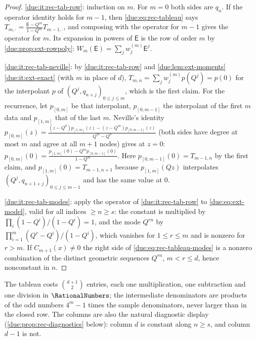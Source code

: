 \documentclass[11pt,oneside]{article}
\theoremstyle{plain}
\theoremstyle{definition}
\theoremstyle{remark}
\newcommand{\upn}[1]{\RvachevUp_{#1}}
\newcommand{\Qq}{Q}                                         %
\newcommand{\Cr}[2]{C_{#1}\!\left(#2\right)}                %
\newcommand{\qn}[1]{q_{#1}}                                 %
\newcommand{\Wrow}[2]{w^{(#1)}_{#2}}                        %
\begin{document}
\begin{proof}
\ref{due:it:rec-tab-row}: induction on $m$.  For $m=0$ both sides are
$\qn{n}$.  If the operator identity holds for $m-1$, then
\cref{due:eq:rec-tableau} says
$T_{m,\cdot}=\frac{\mathsf E-\Qq^{m}}{1-\Qq^{m}}T_{m-1,\cdot}$, and composing
with the operator for $m-1$ gives the operator for $m$.  Its expansion in
powers of $\mathsf E$ is the row of order $m$ by
\cref{due:prop:ext-rowpoly}: $W_{m}(\mathsf E)=\sum_{j}\Wrow{m}{j}\mathsf E^{j}$.

\ref{due:it:rec-tab-neville}: by \ref{due:it:rec-tab-row} and
\cref{due:lem:ext-moments}\ref{due:it:ext-exact} (with $m$ in place of $d$),
$T_{m,n}=\sum_{j}\Wrow{m}{j}p(\Qq^{j})=p(0)$ for the interpolant $p$ of
$(\Qq^{j},\qn{n+j})_{0\le j\le m}$, which is the first claim.  For the
recurrence, let $p_{[0,m]}$ be that interpolant, $p_{[0,m-1]}$ the interpolant
of the first $m$ data and $p_{[1,m]}$ that of the last $m$.  Neville's identity
$p_{[0,m]}(z)=\frac{(z-\Qq^{0})p_{[1,m]}(z)-(z-\Qq^{m})p_{[0,m-1]}(z)}{\Qq^{m}-\Qq^{0}}$
(both sides have degree at most $m$ and agree at all $m+1$ nodes) gives at
$z=0$: $p_{[0,m]}(0)=\frac{p_{[1,m]}(0)-\Qq^{m}p_{[0,m-1]}(0)}{1-\Qq^{m}}$.
Here $p_{[0,m-1]}(0)=T_{m-1,n}$ by the first claim, and
$p_{[1,m]}(0)=T_{m-1,n+1}$ because $p_{[1,m]}(\Qq z)$ interpolates
$(\Qq^{j},\qn{n+1+j})_{0\le j\le m-1}$ and has the same value at $0$.

\ref{due:it:rec-tab-modes}: apply the operator of \ref{due:it:rec-tab-row} to
\cref{due:eq:ext-model}, valid for all indices $\ge n\ge s$: the constant is
multiplied by $\prod_{i}(1-\Qq^{i})/(1-\Qq^{i})=1$, and the mode $\Qq^{rn}$ by
$\prod_{i=1}^{m}(\Qq^{r}-\Qq^{i})/(1-\Qq^{i})$, which vanishes for
$1\le r\le m$ and is nonzero for $r>m$.  If $\Cr{m+1}{x}\ne0$ the right side
of \cref{due:eq:rec-tableau-modes} is a nonzero combination of the distinct
geometric sequences $\Qq^{rn}$, $m<r\le d$, hence nonconstant in $n$.
\end{proof}

The tableau costs $\binom{d+1}{2}$ entries, each one multiplication, one
subtraction and one division in $\RationalNumbers$; the intermediate
denominators are products of the odd numbers $4^{m}-1$ times the sample
denominators, never larger than in the closed row.  The columns are also the
natural diagnostic display (\cref{due:prop:rec-diagnostics} below): column
$d$ is constant along $n\ge s$, and column $d-1$ is not.
\end{document}
